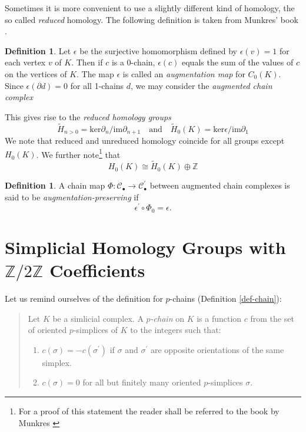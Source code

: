 \documentclass[toc=bib, headinclude]{scrartcl}
\theoremstyle{plain}
\theoremstyle{definition}
\newtheorem	{definition}[theorem]{Definition}
\theoremstyle{remark}
\newcommand{\isom}{\cong}
\newcommand{\SH}{Simplicial Homology}
\newcommand{\Z}{\mathbb{Z}}
\newcommand{\qandq}{\quad \text{and} \quad}
\begin{document}
Sometimes it is more convenient to use a slightly different kind of homology, the so called \emph{reduced} homology. The following definition is taken from Munkres' book \parencite[p. 43]{mu}.
\begin{definition}
	Let $\epsilon$ be the surjective homomorphism defined by $\epsilon(v)=1$ for each vertex $v$ of $K$. Then if $c$ is a 0-chain, $\epsilon(c)$ equals the sum of the values of $c$ on the vertices of $K$. The map $\epsilon$ is called an \textit{augmentation map} for $C_0(K)$. Since $\epsilon(\partial d)=0$ for all 1-chains $d$, we may consider the \textit{augmented chain complex}
	\begin{center}
\end{center}
This gives rise to the \textit{reduced homology groups}
\[
\tilde{H}_{n>0}=\mathrm{ker}\partial_n/\mathrm{im}\partial_{n+1}\qandq \tilde{H}_0(K)=\mathrm{ker}\epsilon/\mathrm{im}\partial_1
\]
We note that reduced and unreduced homology coincide for all groups except $H_0(K)$. We further note\footnote{For a proof of this statement the reader shall be referred to the book by Munkres  \parencite[p. 43]{mu}} that 
\[
H_0(K)\isom \tilde{H}_0(K)\oplus \Z
\]
\end{definition}
\begin{definition}
	A chain map $\Phi: \mathcal{C}_\bullet\to \mathcal{C}^\prime_\bullet$ between augmented chain complexes is said to be \textit{augmentation-preserving} if \[
	\epsilon^\prime\circ \Phi_0=\epsilon.
	\]
\end{definition}

\section{\SH{} Groups with $\mathbb{Z}/2\mathbb{Z}$ Coefficients}

Let us remind ourselves of the definition for $p$-chains (Definition \ref{def-chain}):
\begin{quotation}
	Let $K$ be a simlicial complex. A \textit{$p$-chain} on $K$ is a function $c$ from the set of oriented $p$-simplices of $K$ to the integers such that:
	\begin{enumerate}
		\item $c(\sigma)=-c(\sigma^\prime)$ if $\sigma$ and $\sigma^\prime$ are opposite orientations of the same simplex.
		\item $c(\sigma)=0$ for all but finitely many oriented $p$-simplices $\sigma$.
	\end{enumerate}
\end{quotation}
\end{document}
